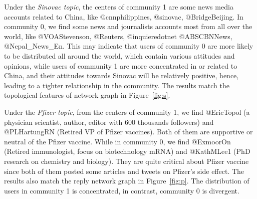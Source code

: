 \documentclass[sigplan,screen]{acmart}
\begin{document}
Under the \textit{Sinovac topic}, the centers of community 1 are some news media accounts related to China, like @cnnphilippines, @sinovac, @BridgeBeijing. In community 0, we find some news and journalists accounts most from all over the world, like @VOAStevenson, @Reuters, @inquieredotnet @ABSCBNNews, @Nepal\_News\_En. This may indicate that users of community 0 are more likely to be distributed all around the world, which contain various attitudes and opinions, while users of community 1 are more concentrated in or related to China, and their attitudes towards Sinovac will be relatively positive, hence, leading to a tighter relationship in the community. The results match the topological features of network graph in Figure~\ref{fig:s}.

Under the \textit{Pfizer topic}, from the centers of community 1, we find @EricTopol (a physician scientist, author, editor with 600 thousands followers) and @PLHartungRN (Retired VP of Pfizer vaccines). Both of them are supportive or neutral of the Pfizer vaccine. While in community 0, we find @ExmoorOn (Retired immunologist, focus on biotechnology mRNA) and @KathMLee1 (PhD research on chemistry and biology). They are quite critical about Pfizer vaccine since both of them posted some articles and tweets on Pfizer’s side effect. The results also match the reply network graph in Figure~\ref{fig:p}. The distribution of users in community 1 is concentrated, in contrast, community 0 is divergent.
\end{document}
